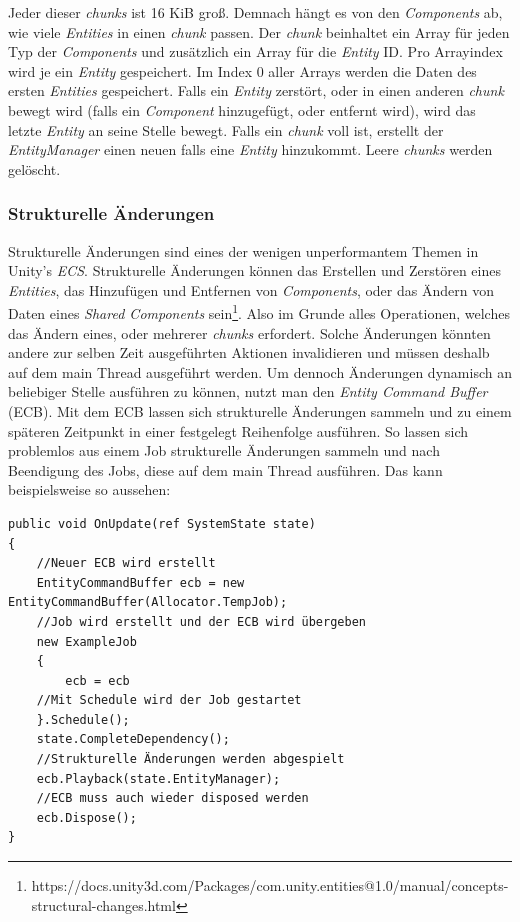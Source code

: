 \documentclass[12pt, titlepage]{article}
\DeclareRobustCommand{\#}{\adjustbox{valign=B,totalheight=.57\baselineskip}{\oldhash}}%
\begin{document}
Jeder dieser \textit{chunks} ist 16 KiB groß. Demnach hängt es von den \textit{Components} ab, wie viele \textit{Entities} in einen \textit{chunk} passen. Der \textit{chunk} beinhaltet ein Array für jeden Typ der \textit{Components} und zusätzlich ein Array für die \textit{Entity} ID. Pro Arrayindex wird je ein \textit{Entity} gespeichert. Im Index 0 aller Arrays werden die Daten des ersten \textit{Entities} gespeichert. Falls ein \textit{Entity} zerstört, oder in einen anderen \textit{chunk} bewegt wird (falls ein \textit{Component} hinzugefügt, oder entfernt wird), wird das letzte \textit{Entity} an seine Stelle bewegt. Falls ein \textit{chunk} voll ist, erstellt der \textit{EntityManager} einen neuen falls eine \textit{Entity} hinzukommt. Leere \textit{chunks} werden gelöscht.
\subsubsection{Strukturelle Änderungen}\label{structuralChanges}
Strukturelle Änderungen sind eines der wenigen unperformantem Themen in Unity's \textit{ECS}. Strukturelle Änderungen können das Erstellen und Zerstören eines \textit{Entities}, das Hinzufügen und Entfernen von \textit{Components}, oder das Ändern von Daten eines \textit{Shared Components} sein\footnote{https://docs.unity3d.com/Packages/com.unity.entities@1.0/manual/concepts-structural-changes.html}. Also im Grunde alles Operationen, welches das Ändern eines, oder mehrerer \textit{chunks} erfordert. Solche Änderungen könnten andere zur selben Zeit ausgeführten Aktionen invalidieren und müssen deshalb auf dem main Thread ausgeführt werden. Um dennoch Änderungen dynamisch an beliebiger Stelle ausführen zu können, nutzt man den \textit{Entity Command Buffer} (ECB). Mit dem ECB lassen sich strukturelle Änderungen sammeln und zu einem späteren Zeitpunkt in einer festgelegt Reihenfolge ausführen. So lassen sich problemlos aus einem Job strukturelle Änderungen sammeln und nach Beendigung des Jobs, diese auf dem main Thread ausführen. Das kann beispielsweise so aussehen:
\begin{lstlisting}[style=code, caption={ECB Beispiel}]
public void OnUpdate(ref SystemState state)
{
    //Neuer ECB wird erstellt
    EntityCommandBuffer ecb = new EntityCommandBuffer(Allocator.TempJob);
    //Job wird erstellt und der ECB wird übergeben
    new ExampleJob
    {
        ecb = ecb
    //Mit Schedule wird der Job gestartet
    }.Schedule();
    state.CompleteDependency();
    //Strukturelle Änderungen werden abgespielt
    ecb.Playback(state.EntityManager);
    //ECB muss auch wieder disposed werden
    ecb.Dispose();
}
\end{lstlisting}
\end{document}
